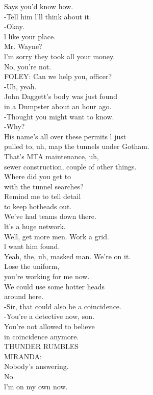 \documentclass{article}
\begin{document}
\begin{multicols}{3}
Says you'd know how.\\
-Tell him l'll think about it.\\
-Okay.\\
l like your place.\\
Mr. Wayne?\\
l'm sorry they took all your money.\\
No, you're not.\\
FOLEY: Can we help you, officer?\\
-Uh, yeah.\\
John Daggett's body was just found\\
in a Dumpster about an hour ago.\\
-Thought you might want to know.\\
-Why?\\
His name's all over these permits l just\\
pulled to, uh, map the tunnels under Gotham.\\
That's MTA maintenance, uh,\\
sewer construction, couple of other things.\\
Where did you get to\\
with the tunnel searches?\\
Remind me to tell detail\\
to keep hotheads out.\\
We've had teams down there.\\
lt's a huge network.\\
Well, get more men. Work a grid.\\
l want him found.\\
Yeah, the, uh, masked man. We're on it.\\
Lose the uniform,\\
you're working for me now.\\
We could use some hotter heads\\
around here.\\
-Sir, that could also be a coincidence.\\
-You're a detective now, son.\\
You're not allowed to believe\\
in coincidence anymore.\\
THUNDER RUMBLES\\
MIRANDA:\\
Nobody's answering.\\
No.\\
l'm on my own now.\\

\end{multicols}
\end{document}
